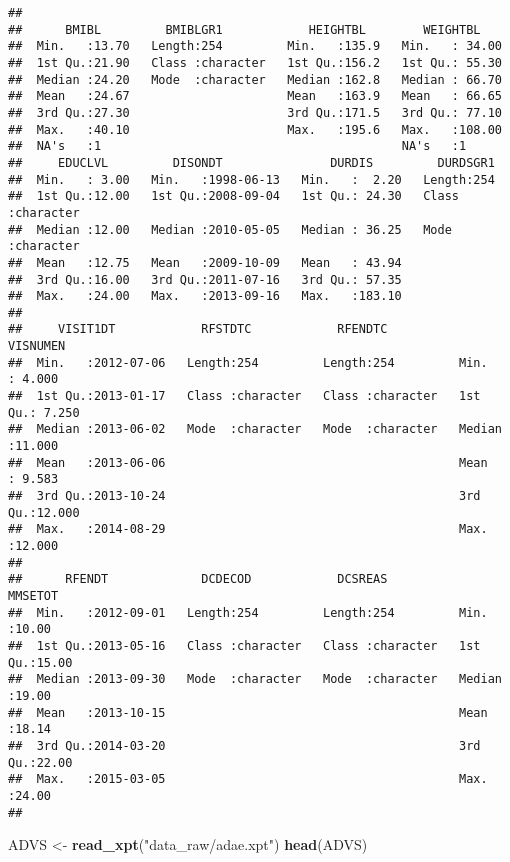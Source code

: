\documentclass[]{book}
\newenvironment{Shaded}{\begin{snugshade}}{\end{snugshade}}
\newcommand{\KeywordTok}[1]{\textcolor[rgb]{0.13,0.29,0.53}{\textbf{#1}}}
\newcommand{\NormalTok}[1]{#1}
\newcommand{\StringTok}[1]{\textcolor[rgb]{0.31,0.60,0.02}{#1}}
\begin{document}
\begin{verbatim}
##                                                                             
##      BMIBL         BMIBLGR1            HEIGHTBL        WEIGHTBL     
##  Min.   :13.70   Length:254         Min.   :135.9   Min.   : 34.00  
##  1st Qu.:21.90   Class :character   1st Qu.:156.2   1st Qu.: 55.30  
##  Median :24.20   Mode  :character   Median :162.8   Median : 66.70  
##  Mean   :24.67                      Mean   :163.9   Mean   : 66.65  
##  3rd Qu.:27.30                      3rd Qu.:171.5   3rd Qu.: 77.10  
##  Max.   :40.10                      Max.   :195.6   Max.   :108.00  
##  NA's   :1                                          NA's   :1       
##     EDUCLVL         DISONDT               DURDIS         DURDSGR1        
##  Min.   : 3.00   Min.   :1998-06-13   Min.   :  2.20   Length:254        
##  1st Qu.:12.00   1st Qu.:2008-09-04   1st Qu.: 24.30   Class :character  
##  Median :12.00   Median :2010-05-05   Median : 36.25   Mode  :character  
##  Mean   :12.75   Mean   :2009-10-09   Mean   : 43.94                     
##  3rd Qu.:16.00   3rd Qu.:2011-07-16   3rd Qu.: 57.35                     
##  Max.   :24.00   Max.   :2013-09-16   Max.   :183.10                     
##                                                                          
##     VISIT1DT            RFSTDTC            RFENDTC             VISNUMEN     
##  Min.   :2012-07-06   Length:254         Length:254         Min.   : 4.000  
##  1st Qu.:2013-01-17   Class :character   Class :character   1st Qu.: 7.250  
##  Median :2013-06-02   Mode  :character   Mode  :character   Median :11.000  
##  Mean   :2013-06-06                                         Mean   : 9.583  
##  3rd Qu.:2013-10-24                                         3rd Qu.:12.000  
##  Max.   :2014-08-29                                         Max.   :12.000  
##                                                                             
##      RFENDT             DCDECOD            DCSREAS             MMSETOT     
##  Min.   :2012-09-01   Length:254         Length:254         Min.   :10.00  
##  1st Qu.:2013-05-16   Class :character   Class :character   1st Qu.:15.00  
##  Median :2013-09-30   Mode  :character   Mode  :character   Median :19.00  
##  Mean   :2013-10-15                                         Mean   :18.14  
##  3rd Qu.:2014-03-20                                         3rd Qu.:22.00  
##  Max.   :2015-03-05                                         Max.   :24.00  
## 
\end{verbatim}

\begin{Shaded}
\begin{Highlighting}[]
\NormalTok{ADVS <-}\StringTok{ }\KeywordTok{read_xpt}\NormalTok{(}\StringTok{"data_raw/adae.xpt"}\NormalTok{)}
\KeywordTok{head}\NormalTok{(ADVS)}
\end{Highlighting}
\end{Shaded}
\end{document}
